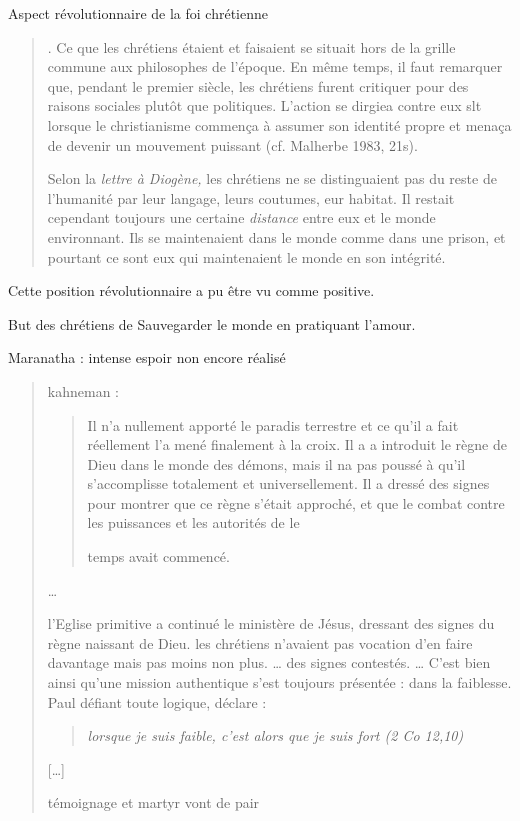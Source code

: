 Aspect révolutionnaire de la foi chrétienne 
\begin{quote}
. Ce que les chrétiens étaient et faisaient se situait hors de la grille commune aux philosophes de l'époque. En même temps, il faut 
remarquer que, pendant le premier siècle, les chrétiens furent critiquer 
pour des raisons sociales plutôt que politiques. L'action se dirgiea contre eux slt lorsque le christianisme commença à assumer son identité propre et menaça de devenir un mouvement puissant (cf. Malherbe 1983, 21s).
 
 
 
 Selon la \textit{lettre à Diogène, } les chrétiens ne se distinguaient pas du reste de l'humanité par leur langage, leurs coutumes, eur habitat. Il restait cependant toujours une certaine \textit{distance} entre eux et le monde environnant. Ils se maintenaient dans le monde comme dans une prison, et pourtant ce sont eux qui maintenaient le monde en son intégrité.
\end{quote}

Cette position révolutionnaire a pu être vu comme positive. 
\begin{Synthesis}
But des chrétiens de Sauvegarder le monde en pratiquant l'amour. 

Maranatha : intense espoir non encore réalisé
\end{Synthesis}

\begin{quote} 
    kahneman : 
    \begin{quote}
    
    Il n'a nullement apporté le paradis terrestre et ce qu'il a fait réellement l'a
mené finalement à la croix. Il a a introduit le règne de Dieu dans le monde 
des démons, mais il na pas poussé à qu'il s'accomplisse totalement et 
universellement. Il a dressé des signes pour montrer que ce règne s'était
approché, et que le combat contre les puissances et les autorités de le
 
temps avait commencé.
\end{quote}
 
 \ldots
 
 l'Eglise primitive a continué le ministère de Jésus, dressant des signes du règne naissant de Dieu. les chrétiens n'avaient pas vocation d'en faire davantage mais pas moins non plus.
\ldots
des signes contestés. \ldots
C'est bien ainsi qu'une mission authentique s'est toujours présentée : dans la faiblesse. Paul défiant toute logique, déclare : \begin{quote}
    \textit{lorsque je suis faible, c'est alors que je suis fort (2 Co 12,10)}
\end{quote}
[\ldots]

témoignage et martyr vont de pair
\end{quote}


